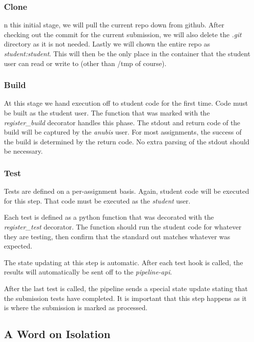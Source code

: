 \subsubsection{Clone}

n this initial stage, we will pull the current repo down from github.
After checking out the commit for the current submission, we will also delete
the \textit{.git} directory as it is not needed.
Lastly we will chown the entire repo as \textit{student:student}.
This will then be the only place in the container that the student user
can read or write to (other than /tmp of course).

\subsubsection{Build}

At this stage we hand execution off to student code for the first time.
Code must be built as the student user.
The function that was marked with the \textit{register\_build} decorator handles this phase.
The stdout and return code of the build will be captured by the \textit{anubis} user.
For most assignments, the success of the build is determined by the return code.
No extra parsing of the stdout should be necessary.

\subsubsection{Test}

Tests are defined on a per-assignment basis.
Again, student code will be executed for this step.
That code must be executed as the \textit{student} user.

Each test is defined as a python function that was decorated with the
\textit{register\_test} decorator.
The function should run the student code for whatever they are testing, then
confirm that the standard out matches whatever was expected.

The state updating at this step is automatic.
After each test hook is called, the results will automatically be sent off to the
\textit{pipeline-api}.

After the last test is called, the pipeline sends a special state update stating that
the submission tests have completed.
It is important that this step happens as it is where the submission is marked as
processed.

\subsection{A Word on Isolation}\label{subsec:a-word-on-isolation}


